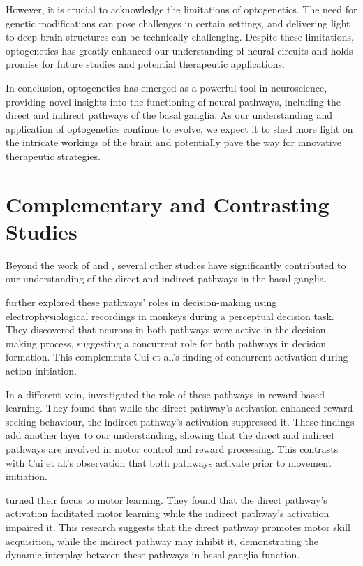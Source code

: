 \documentclass[10pt]{article}
\begin{document}
\begin{sloppypar}
  However, it is crucial to acknowledge the limitations of optogenetics. The need for genetic modifications can pose challenges in certain settings, and delivering light to deep brain structures can be technically challenging. Despite these limitations, optogenetics has greatly enhanced our understanding of neural circuits and holds promise for future studies and potential therapeutic applications.

  In conclusion, optogenetics has emerged as a powerful tool in neuroscience, providing novel insights into the functioning of neural pathways, including the direct and indirect pathways of the basal ganglia. As our understanding and application of optogenetics continue to evolve, we expect it to shed more light on the intricate workings of the brain and potentially pave the way for innovative therapeutic strategies.

  \section{Complementary and Contrasting Studies}
  \label{sec:complementary-and-contrasting-studies}

  Beyond the work of \cite{cui_concurrent_2013} and \cite{kravitz_regulation_2010}, several other studies have significantly contributed to our understanding of the direct and indirect pathways in the basal ganglia.

  \cite{yttri_opponent_2016} further explored these pathways’ roles in decision-making using electrophysiological recordings in monkeys during a perceptual decision task. They discovered that neurons in both pathways were active in the decision-making process, suggesting a concurrent role for both pathways in decision formation. This complements Cui et al.’s finding of concurrent activation during action initiation.

  In a different vein, \cite{guillaumin_optogenetic_2020} investigated the role of these pathways in reward-based learning. They found that while the direct pathway’s activation enhanced reward-seeking behaviour, the indirect pathway’s activation suppressed it. These findings add another layer to our understanding, showing that the direct and indirect pathways are involved in motor control and reward processing. This contrasts with Cui et al.’s observation that both pathways activate prior to movement initiation.

  \cite{hilt_evidence_2016} turned their focus to motor learning. They found that the direct pathway’s activation facilitated motor learning while the indirect pathway’s activation impaired it. This research suggests that the direct pathway promotes motor skill acquisition, while the indirect pathway may inhibit it, demonstrating the dynamic interplay between these pathways in basal ganglia function.


\end{sloppypar}
\end{document}
